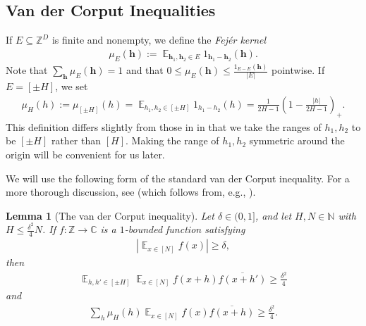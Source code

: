 \documentclass[11pt]{amsart}
\newtheorem{lemma}{Lemma}[section]
\theoremstyle{definition}
\DeclareMathOperator*{\E}{\mathbb{E}}
\newcommand{\C}{{\mathbb C}}
\newcommand{\N}{{\mathbb N}}
\newcommand{\Z}{{\mathbb Z}}
\newcommand{\bh}{{\mathbf{h}}}
\newcommand{\abs}[1]{\mathopen{}\left| #1\mathclose{}\right|}
\newcommand{\brac}[1]{\mathopen{}\left( #1 \mathclose{}\right)}
\begin{document}
\subsection{Van der Corput Inequalities} 

If $E\subseteq \Z^D$ is finite {and nonempty}, we define the \textit{Fej\'er kernel}
\begin{align*}
    \mu_E(\bh) := \E_{\bh_1, \bh_2\in E}1_{\bh_1 - \bh_2}(\bh). 
\end{align*}
Note that $\sum_\bh \mu_E(\bh) = 1$ and that $0\leq \mu_E(\bh)\leq \frac{1_{E-E}(\bh)}{|E|}$ pointwise. If $E = [\pm H]$, we set
\begin{align*}
    \mu_H(h):=\mu_{[\pm H]}(h) = \E_{h_1, h_2\in[\pm H]} 1_{h_1 - h_2}(h) = \frac{1}{2H-1}\brac{1-\frac{|h|}{2H-1}}_+.
\end{align*}
This definition differs slightly from those in \cite{Pel20, PP19, PP20, Pre17} in that we take the ranges of $h_1, h_2$ to be $[\pm H]$ rather than $[H]$. Making the range of $h_1, h_2$ symmetric around the origin will be convenient for us later.

We will use the following form of the 
standard van der Corput inequality.  For a more thorough discussion, see \cite[Section 3]{KKL24a} (which follows from, e.g., \cite[Lemma 3.2]{Pre17}).

\begin{lemma}[The van der Corput inequality]\label{L: vdC}
    Let $\delta\in(0, 1]$, and let $H, N\in\N$ with $H\leq \frac{\delta^2}{4}N$. If $f:\Z\to\C$ is a $1$-bounded function satisfying 
    \begin{align}\label{E: assumption in vdC}
        \abs{\E_{x\in[N]}f(x)}\geq \delta,
    \end{align}
    then
    \begin{align*}
        \E_{h,h'\in[\pm H]}\E_{x\in[N]}f(x+h)\overline{f(x+h')}\geq \frac{\delta^2}{4}
    \end{align*}
    and
    \begin{align*}
        {\sum_{h}\mu_H(h)\E_{x\in[N]}f(x)\overline{f(x+h)}}\geq \frac{\delta^2}{4}.
    \end{align*}
\end{lemma}
\end{document}
